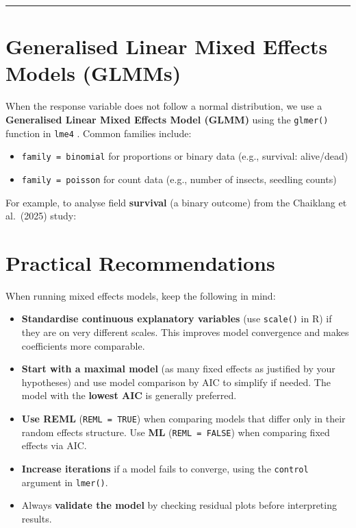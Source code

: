 \documentclass[
]{book}
\providecommand{\tightlist}{%
  \setlength{\itemsep}{0pt}\setlength{\parskip}{0pt}}
\begin{document}
\begin{center}\rule{0.5\linewidth}{0.5pt}\end{center}

\section{Generalised Linear Mixed Effects Models (GLMMs)}\label{generalised-linear-mixed-effects-models-glmms}

When the response variable does not follow a normal distribution, we use a \textbf{Generalised Linear Mixed Effects Model (GLMM)} using the \texttt{glmer()} function in \texttt{lme4} \citep{Bates2015}. Common families include:

\begin{itemize}
\tightlist
\item
  \texttt{family\ =\ binomial} for proportions or binary data (e.g., survival: alive/dead)
\item
  \texttt{family\ =\ poisson} for count data (e.g., number of insects, seedling counts)
\end{itemize}

For example, to analyse field \textbf{survival} (a binary outcome) from the Chaiklang et al.~(2025) study:

\section{Practical Recommendations}\label{practical-recommendations}

When running mixed effects models, keep the following in mind:

\begin{itemize}
\tightlist
\item
  \textbf{Standardise continuous explanatory variables} (use \texttt{scale()} in R) if they are on very different scales. This improves model convergence and makes coefficients more comparable.
\item
  \textbf{Start with a maximal model} (as many fixed effects as justified by your hypotheses) and use model comparison by AIC to simplify if needed. The model with the \textbf{lowest AIC} is generally preferred.
\item
  \textbf{Use REML} (\texttt{REML\ =\ TRUE}) when comparing models that differ only in their random effects structure. Use \textbf{ML} (\texttt{REML\ =\ FALSE}) when comparing fixed effects via AIC.
\item
  \textbf{Increase iterations} if a model fails to converge, using the \texttt{control} argument in \texttt{lmer()}.
\item
  Always \textbf{validate the model} by checking residual plots before interpreting results.
\end{itemize}
\end{document}
